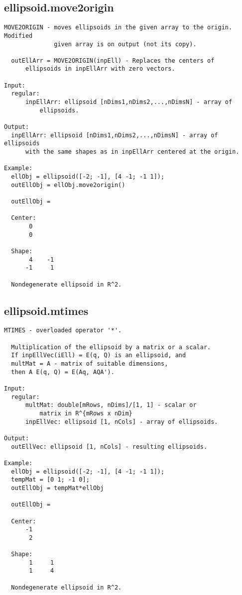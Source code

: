 \subsection{\texorpdfstring{ellipsoid.move2origin}{move2origin}}\label{method:ellipsoid.move2origin}
\begin{verbatim}
MOVE2ORIGIN - moves ellipsoids in the given array to the origin. Modified
              given array is on output (not its copy).

  outEllArr = MOVE2ORIGIN(inpEll) - Replaces the centers of
      ellipsoids in inpEllArr with zero vectors.

Input:
  regular:
      inpEllArr: ellipsoid [nDims1,nDims2,...,nDimsN] - array of
          ellipsoids.

Output:
  inpEllArr: ellipsoid [nDims1,nDims2,...,nDimsN] - array of ellipsoids
      with the same shapes as in inpEllArr centered at the origin.

Example:
  ellObj = ellipsoid([-2; -1], [4 -1; -1 1]);
  outEllObj = ellObj.move2origin()

  outEllObj =

  Center:
       0
       0

  Shape:
       4    -1
      -1     1

  Nondegenerate ellipsoid in R^2.
\end{verbatim}
\subsection{\texorpdfstring{ellipsoid.mtimes}{mtimes}}\label{method:ellipsoid.mtimes}
\begin{verbatim}
MTIMES - overloaded operator '*'.

  Multiplication of the ellipsoid by a matrix or a scalar.
  If inpEllVec(iEll) = E(q, Q) is an ellipsoid, and
  multMat = A - matrix of suitable dimensions,
  then A E(q, Q) = E(Aq, AQA').

Input:
  regular:
      multMat: double[mRows, nDims]/[1, 1] - scalar or
          matrix in R^{mRows x nDim}
      inpEllVec: ellipsoid [1, nCols] - array of ellipsoids.

Output:
  outEllVec: ellipsoid [1, nCols] - resulting ellipsoids.

Example:
  ellObj = ellipsoid([-2; -1], [4 -1; -1 1]);
  tempMat = [0 1; -1 0];
  outEllObj = tempMat*ellObj

  outEllObj =

  Center:
      -1
       2

  Shape:
       1     1
       1     4

  Nondegenerate ellipsoid in R^2.
\end{verbatim}
